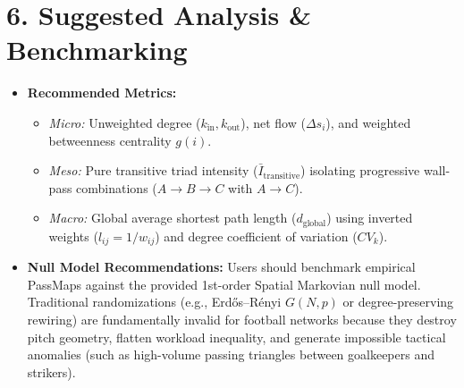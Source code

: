 \documentclass[12pt, a4paper]{article}
\begin{document}
\section*{6. Suggested Analysis \& Benchmarking}
\begin{itemize}
    \item \textbf{Recommended Metrics:}
    \begin{itemize}
        \item \textit{Micro:} Unweighted degree ($k_{\text{in}}, k_{\text{out}}$), net flow ($\Delta s_i$), and weighted betweenness centrality $g(i)$.
        \item \textit{Meso:} Pure transitive triad intensity ($\bar{I}_{\text{transitive}}$) isolating progressive wall-pass combinations ($A \to B \to C$ with $A \to C$).
        \item \textit{Macro:} Global average shortest path length ($d_{\text{global}}$) using inverted weights ($l_{ij} = 1/w_{ij}$) and degree coefficient of variation ($CV_k$).
    \end{itemize}
    \item \textbf{Null Model Recommendations:} Users should benchmark empirical PassMaps against the provided 1st-order Spatial Markovian null model. Traditional randomizations (e.g., Erd{\H{o}}s--R{\'e}nyi $G(N,p)$ or degree-preserving rewiring) are fundamentally invalid for football networks because they destroy pitch geometry, flatten workload inequality, and generate impossible tactical anomalies (such as high-volume passing triangles between goalkeepers and strikers).
\end{itemize}
\end{document}
